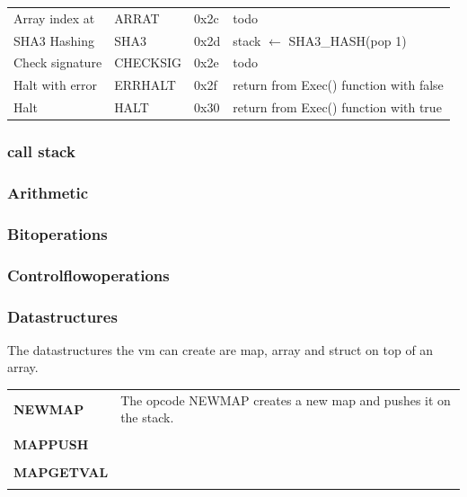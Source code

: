 \begin{table}[]
\begin{tabular}{@{}llll@{}}
Array index at       & ARRAT             & 0x2c            & todo                                                     \\
SHA3 Hashing         & SHA3              & 0x2d            & stack $\leftarrow$ SHA3\_HASH(pop 1)                                \\
Check signature      & CHECKSIG          & 0x2e            & todo                                                     \\
Halt with error      & ERRHALT           & 0x2f            & return from Exec() function with false                   \\
Halt                 & HALT              & 0x30            & return from Exec() function with true                    \\ \bottomrule
\end{tabular}
\end{table}

\subsubsection{call stack}

\subsubsection{Arithmetic}

\subsubsection{Bitoperations}


\subsubsection{Controlflowoperations}


\subsubsection{Datastructures}
The datastructures the vm can create are map, array and struct on top of an array. 




\begin{tabular}[t]{ p{3cm} p{12.5cm}}
\textbf{NEWMAP} & 
The opcode NEWMAP creates a new map and pushes it on the stack. 
\\ \\

\textbf{MAPPUSH} & 
\\ \\

\textbf{MAPGETVAL} & 
\\ \\

\end{tabular}

